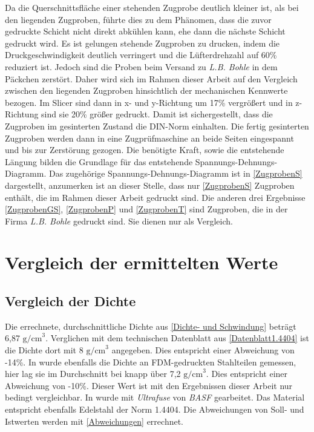 Da die Querschnittsfläche einer stehenden Zugprobe deutlich kleiner ist, als bei den liegenden Zugproben, führte dies zu dem Phänomen, dass die zuvor gedruckte Schicht nicht direkt abkühlen kann, ehe dann die nächste Schicht gedruckt wird. Es ist gelungen stehende Zugproben zu drucken, indem die Druckgeschwindigkeit deutlich verringert und die Lüfterdrehzahl auf 60\% reduziert ist. Jedoch sind die Proben beim Versand zu \textit{L.B. Bohle} in dem Päckchen zerstört. Daher wird sich im Rahmen dieser Arbeit auf den Vergleich zwischen den liegenden Zugproben hinsichtlich der mechanischen Kennwerte bezogen.
Im Slicer sind dann in x- und y-Richtung um 17\% vergrößert und in z-Richtung sind sie 20\% größer gedruckt. Damit ist sichergestellt, dass die Zugproben im gesinterten Zustand die DIN-Norm einhalten. Die fertig gesinterten Zugproben werden dann in eine Zugprüfmaschine an beide Seiten eingespannt und bis zur Zerstörung gezogen. Die benötigte Kraft, sowie die entstehende Längung bilden die Grundlage für das entstehende Spannungs-Dehnungs-Diagramm.
Das zugehörige Spannungs-Dehnungs-Diagramm ist in \autoref{ZugprobenS} dargestellt, anzumerken ist an dieser Stelle, dass nur \autoref{ZugprobenS} Zugproben enthält, die im Rahmen dieser Arbeit gedruckt sind. Die anderen drei Ergebnisse \autoref{ZugprobenGS}, \autoref{ZugprobenP} und \autoref{ZugprobenT} sind Zugproben, die in der Firma \textit{L.B. Bohle} gedruckt sind. Sie dienen nur als Vergleich.
 
\section{Vergleich der ermittelten Werte}

\subsection{Vergleich der Dichte}

Die errechnete, durchschnittliche Dichte aus \autoref{Dichte- und Schwindung} beträgt 6,87 \(\text{g/cm}^3\). Verglichen mit dem technischen Datenblatt aus \autoref{Datenblatt1.4404} ist die Dichte dort mit 8 \(\text{g/cm}^3\) angegeben. Dies entspricht einer Abweichung von -14\%. In \Autocite{Quarto.2021} wurde ebenfalls die Dichte an FDM-gedruckten Stahlteilen gemessen, hier lag sie im Durchschnitt bei knapp über 7,2 \(\text{g/cm}^3\). Dies entspricht einer Abweichung von -10\%. Dieser Wert ist mit den Ergebnissen dieser Arbeit nur bedingt vergleichbar. In \autocite{Quarto.2021} wurde mit \textit{Ultrafuse} von \textit{BASF} gearbeitet. Das Material entspricht ebenfalls Edelstahl der Norm 1.4404. Die Abweichungen von Soll- und Istwerten werden mit \autoref{Abweichungen} errechnet.

